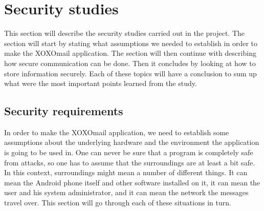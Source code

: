 \section{Security studies}\label{sec:seqreq}
This section will describe the security studies carried out in the project. The section will start by stating what assumptions we needed to establish in order to make the XOXOmail application. The section will then continue with describing how secure communication can be done. Then it concludes by looking at how to store information securely. Each of these topics will have a conclusion to sum up what were the most important points learned from the study.

\subsection{Security requirements}
In order to make the XOXOmail application, we need to establish some assumptions about the underlying hardware and the environment the application is going to be used in. One can never be sure that a program is completely safe from attacks, so one has to assume that the surroundings are at least a bit safe. In this context, surroundings might mean a number of different things. It can mean the Android phone itself and other software installed on it, it can mean the user and his system administrator, and it can mean the network the messages travel over. This section will go through each of these situations in turn.

